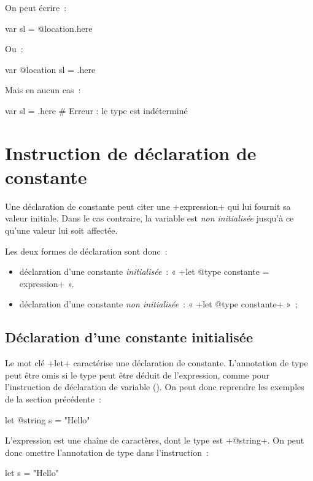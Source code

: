 On peut écrire~:
\begin{galgas3}
var sl = @location.here
\end{galgas3}

Ou~:
\begin{galgas3}
var @location sl = .here
\end{galgas3}

Mais en aucun cas~:
\begin{galgas3}
var sl = .here # Erreur : le type est indéterminé
\end{galgas3}





\section{Instruction de déclaration de constante}

Une déclaration de constante peut citer une \ggst+expression+ qui lui fournit sa valeur initiale. Dans le cas contraire, la variable est \emph{non initialisée} jusqu'à ce qu'une valeur lui soit affectée.

Les deux formes de déclaration sont donc~:
\begin{itemize}
\item déclaration d'une constante \emph{initialisée}~: « \ggst+let @type constante = expression+ ».
\item déclaration d'une constante \emph{non initialisée}~: « \ggst+let @type constante+ »~;
\end{itemize}

\subsection{Déclaration d'une constante initialisée}


Le mot clé \ggst+let+ caractérise une déclaration de constante. L'annotation de type peut être omis si le type peut être déduit de l'expression, comme pour l'instruction de déclaration de variable (). On peut donc reprendre les exemples de la section précédente~:
\begin{galgas3}
let @string s = "Hello"
\end{galgas3}

L'expression est une chaîne de caractères, dont le type est \ggst+@string+. On peut donc omettre l'annotation de type dans l'instruction~:
\begin{galgas3}
let s = "Hello"
\end{galgas3}



